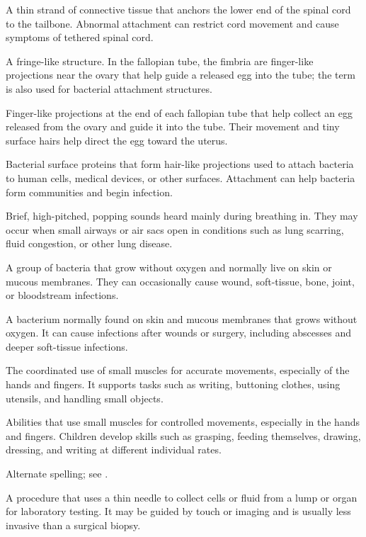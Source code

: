  A thin strand of connective tissue that anchors the lower end of the spinal cord to the tailbone. Abnormal attachment can restrict cord movement and cause symptoms of tethered spinal cord.

 A fringe-like structure. In the fallopian tube, the fimbria are finger-like projections near the ovary that help guide a released egg into the tube; the term is also used for bacterial attachment structures.

 Finger-like projections at the end of each fallopian tube that help collect an egg released from the ovary and guide it into the tube. Their movement and tiny surface hairs help direct the egg toward the uterus.

 Bacterial surface proteins that form hair-like projections used to attach bacteria to human cells, medical devices, or other surfaces. Attachment can help bacteria form communities and begin infection.

 Brief, high-pitched, popping sounds heard mainly during breathing in. They may occur when small airways or air sacs open in conditions such as lung scarring, fluid congestion, or other lung disease.

 A group of bacteria that grow without oxygen and normally live on skin or mucous membranes. They can occasionally cause wound, soft-tissue, bone, joint, or bloodstream infections.

 A bacterium normally found on skin and mucous membranes that grows without oxygen. It can cause infections after wounds or surgery, including abscesses and deeper soft-tissue infections.

 The coordinated use of small muscles for accurate movements, especially of the hands and fingers. It supports tasks such as writing, buttoning clothes, using utensils, and handling small objects.

 Abilities that use small muscles for controlled movements, especially in the hands and fingers. Children develop skills such as grasping, feeding themselves, drawing, dressing, and writing at different individual rates.

 Alternate spelling; see .

 A procedure that uses a thin needle to collect cells or fluid from a lump or organ for laboratory testing. It may be guided by touch or imaging and is usually less invasive than a surgical biopsy.

